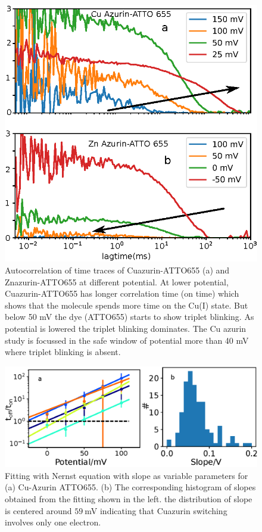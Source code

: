 \documentclass[11pt,a4paper,onecolumn]{article}
\begin{document}
\begin{figure}
  \centering
  \includegraphics[]{fcs_comparision.eps}
  \makeatletter
  \renewcommand{\fnum@figure}{\figurename~S\thefigure}
  \makeatother
  \caption{Autocorrelation of time traces of Cuazurin-ATTO655 (a) and Znazurin-ATTO655 at different potential. At lower potential, Cuazurin-ATTO655 has longer correlation time (on time) which shows that the molecule spends more time on the Cu(I) state. But below 50 mV the dye (ATTO655) starts to show triplet blinking. As potential is lowered the triplet blinking dominates. The Cu azurin study is focussed in the safe window of potential more than 40 mV where triplet blinking is absent.}
  \label{SIfig:fcscomparision}
\end{figure}
\begin{figure}
  \centering
  \includegraphics[width=\textwidth,keepaspectratio]{SI_potential_slope.eps}
	\makeatletter
	\renewcommand{\fnum@figure}{\figurename~S\thefigure}
	\makeatother
  \caption{Fitting with Nernst equation with slope as variable parameters for  (a) Cu-Azurin ATTO655. (b) The corresponding histogram of slopes obtained from the fitting shown in the left. the distribution of slope is centered around $59~$mV indicating that Cuazurin switching  involves only one electron.}
  \label{SIfig:potential_slope}
\end{figure}
\end{document}
